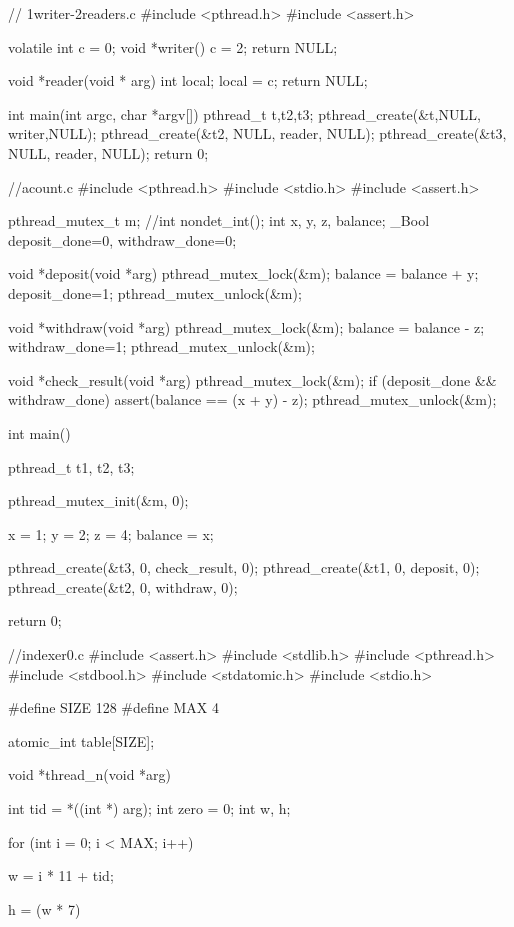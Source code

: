\documentclass[diploma, english]{softlab-thesis}
\theoremstyle{definition}
\begin{document}
\begin{code_appendix}
  // 1writer-2readers.c
  #include <pthread.h>
  #include <assert.h>
  
  volatile int c = 0;
  void *writer(){
    c = 2;
    return NULL;
  }
  
  void *reader(void * arg){
    int local;
    local = c;
    return NULL;
  }
  
  int main(int argc, char *argv[]){
    pthread_t t,t2,t3;
    pthread_create(&t,NULL, writer,NULL);
    pthread_create(&t2, NULL, reader, NULL);
    pthread_create(&t3, NULL, reader, NULL);
    return 0;
  }

  //acount.c
  #include <pthread.h>
  #include <stdio.h>
  #include <assert.h>
  
  pthread_mutex_t m;
  //int nondet_int();
  int x, y, z, balance;
  _Bool deposit_done=0, withdraw_done=0;
  
  void *deposit(void *arg) 
  {
    pthread_mutex_lock(&m);
    balance = balance + y;
    deposit_done=1;
    pthread_mutex_unlock(&m);
  }
  
  void *withdraw(void *arg) 
  {
    pthread_mutex_lock(&m);
    balance = balance - z;
    withdraw_done=1;
    pthread_mutex_unlock(&m);
  }
  
  void *check_result(void *arg) 
  {
    pthread_mutex_lock(&m);
    if (deposit_done && withdraw_done)
      assert(balance == (x + y) - z);
    pthread_mutex_unlock(&m);
  }
  
  int main() 
  {
    pthread_t t1, t2, t3;
  
    pthread_mutex_init(&m, 0);
  
    x = 1;
    y = 2;
    z = 4;
    balance = x;
  
    pthread_create(&t3, 0, check_result, 0);
    pthread_create(&t1, 0, deposit, 0);
    pthread_create(&t2, 0, withdraw, 0);
  
    return 0;
  }

  //indexer0.c
  #include <assert.h>
  #include <stdlib.h>
  #include <pthread.h>
  #include <stdbool.h>
  #include  <stdatomic.h>
  #include <stdio.h>
  
  #define SIZE 128
  #define MAX  4
  
  atomic_int table[SIZE];
  
  void *thread_n(void *arg)
  {
    int tid = *((int *) arg);
    int zero = 0;
    int w, h;
  
    for (int i = 0; i < MAX; i++) {
      w = i * 11 + tid;
  
      h = (w * 7) %
  
}}
\end{code_appendix}
\end{document}
